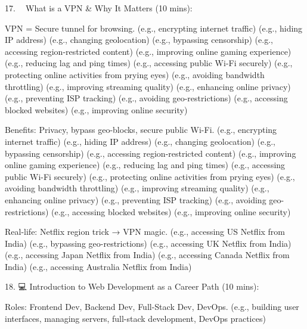     17. 🕵️‍♂️ What is a VPN & Why It Matters (10 mins):

        VPN = Secure tunnel for browsing.
            (e.g., encrypting internet traffic)
            (e.g., hiding IP address)
            (e.g., changing geolocation)
            (e.g., bypassing censorship)
            (e.g., accessing region-restricted content)
            (e.g., improving online gaming experience)
            (e.g., reducing lag and ping times)
            (e.g., accessing public Wi-Fi securely)
            (e.g., protecting online activities from prying eyes)
            (e.g., avoiding bandwidth throttling)
            (e.g., improving streaming quality)
            (e.g., enhancing online privacy)
            (e.g., preventing ISP tracking)
            (e.g., avoiding geo-restrictions)
            (e.g., accessing blocked websites)
            (e.g., improving online security)


        Benefits: Privacy, bypass geo-blocks, secure public Wi-Fi.
            (e.g., encrypting internet traffic)
            (e.g., hiding IP address)
            (e.g., changing geolocation)
            (e.g., bypassing censorship)
            (e.g., accessing region-restricted content)
            (e.g., improving online gaming experience)
            (e.g., reducing lag and ping times)
            (e.g., accessing public Wi-Fi securely)
            (e.g., protecting online activities from prying eyes)
            (e.g., avoiding bandwidth throttling)
            (e.g., improving streaming quality)
            (e.g., enhancing online privacy)
            (e.g., preventing ISP tracking)
            (e.g., avoiding geo-restrictions)
            (e.g., accessing blocked websites)
            (e.g., improving online security)

        Real-life: Netflix region trick → VPN magic.
            (e.g., accessing US Netflix from India)
            (e.g., bypassing geo-restrictions)
            (e.g., accessing UK Netflix from India)
            (e.g., accessing Japan Netflix from India)
            (e.g., accessing Canada Netflix from India)
            (e.g., accessing Australia Netflix from India)




    18. 💻 Introduction to Web Development as a Career Path (10 mins):

        Roles: Frontend Dev, Backend Dev, Full-Stack Dev, DevOps.
            (e.g., building user interfaces, managing servers, full-stack development, DevOps practices)
            

